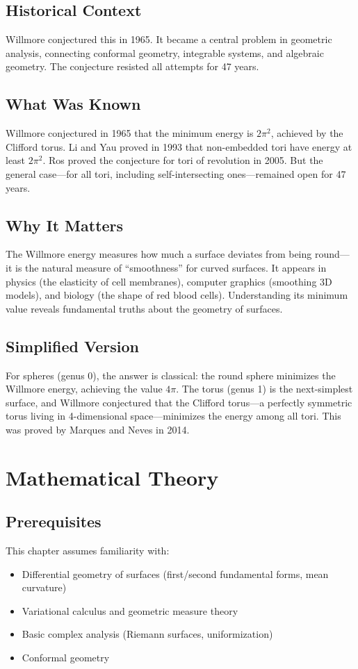 \subsection{Historical Context}
Willmore conjectured this in 1965. It became a central problem in geometric analysis, connecting conformal geometry, integrable systems, and algebraic geometry. The conjecture resisted all attempts for 47 years.

\subsection{What Was Known}
Willmore conjectured in 1965 that the minimum energy is $2\pi^2$, achieved by the Clifford torus. Li and Yau proved in 1993 that non-embedded tori have energy at least $2\pi^2$. Ros proved the conjecture for tori of revolution in 2005. But the general case---for all tori, including self-intersecting ones---remained open for 47 years.

\subsection{Why It Matters}
The Willmore energy measures how much a surface deviates from being round---it is the natural measure of ``smoothness'' for curved surfaces. It appears in physics (the elasticity of cell membranes), computer graphics (smoothing 3D models), and biology (the shape of red blood cells). Understanding its minimum value reveals fundamental truths about the geometry of surfaces.

\subsection{Simplified Version}
For spheres (genus 0), the answer is classical: the round sphere minimizes the Willmore energy, achieving the value $4\pi$. The torus (genus 1) is the next-simplest surface, and Willmore conjectured that the Clifford torus---a perfectly symmetric torus living in 4-dimensional space---minimizes the energy among all tori. This was proved by Marques and Neves in 2014.

\section{Mathematical Theory}


\subsection{Prerequisites}
This chapter assumes familiarity with:
\begin{itemize}
\item Differential geometry of surfaces (first/second fundamental forms, mean curvature)
\item Variational calculus and geometric measure theory
\item Basic complex analysis (Riemann surfaces, uniformization)
\item Conformal geometry
\end{itemize}

